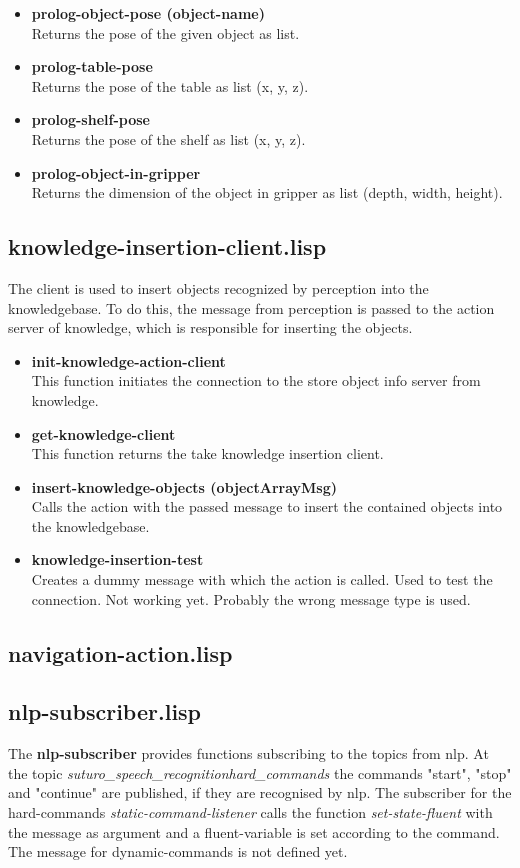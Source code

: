 \documentclass[main.tex]{subfiles}
\begin{document}
\begin{itemize}
				\item \textbf{prolog-object-pose (object-name)} \\ Returns the pose of the given object as list.
				\item \textbf{prolog-table-pose} \\ Returns the pose of the table as list (x, y, z).
				\item \textbf{prolog-shelf-pose} \\ Returns the pose of the shelf as list (x, y, z).
				\item \textbf{prolog-object-in-gripper} \\ Returns the dimension of the object in gripper as list (depth, width, height).
			\end{itemize} 
		\subsection{knowledge-insertion-client.lisp}
		The client is used to insert objects recognized by perception into the knowledgebase. To do this, the message from perception is passed to the action server of knowledge, which is responsible for inserting the objects.
		\begin{itemize}
		  \item \textbf{init-knowledge-action-client} \\
		  This function initiates the connection to the store object info server from knowledge.
		  \item \textbf{get-knowledge-client} \\
		  This function returns the take knowledge insertion client.
		  \item \textbf{insert-knowledge-objects (objectArrayMsg)} \\
		  Calls the action with the passed message to insert the contained objects into the knowledgebase.
		  \item \textbf{knowledge-insertion-test} \\
		  Creates a dummy message with which the action is called. Used to test the connection. Not working yet. Probably the wrong message type is used.
		\end{itemize}
		\subsection{navigation-action.lisp}
		\subsection{nlp-subscriber.lisp}
		The \textbf{nlp-subscriber} provides functions subscribing to the topics from nlp. At the topic \textit{suturo\_speech\_recognition\/hard\_commands} the commands "start", "stop" and "continue" are published, if they are recognised by nlp. The subscriber for the hard-commands \textit{static-command-listener} calls the function \textit{set-state-fluent} with the message as argument and a fluent-variable is set according to the command. The message for dynamic-commands is not defined yet.
\end{document}
